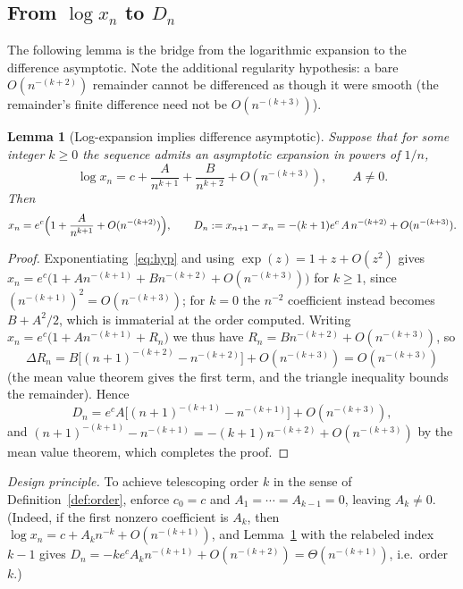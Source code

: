 \documentclass[11pt]{article}
\newtheorem{lemma}[theorem]{Lemma}
\theoremstyle{definition}
\begin{document}
\subsection{From $\log x_n$ to $D_n$}
The following lemma is the bridge from the logarithmic expansion to the
difference asymptotic. Note the additional regularity hypothesis: a bare
$O(n^{-(k+2)})$ remainder cannot be differenced as though it were smooth (the
remainder's finite difference need not be $O(n^{-(k+3)})$).

\begin{lemma}[Log-expansion implies difference asymptotic]\label{lem:logdiff}
Suppose that for some integer $k\ge0$ the sequence admits an asymptotic
expansion in powers of $1/n$,
\begin{equation}\label{eq:hyp}
  \log x_n = c + \frac{A}{n^{k+1}} + \frac{B}{n^{k+2}} + O(n^{-(k+3)}),
  \qquad A\neq0 .
\end{equation}
Then
\[
  x_n = e^{c}\Bigl(1 + \frac{A}{n^{k+1}} + O(n^{-(k+2)})\Bigr),
  \qquad
  D_n := x_{n+1}-x_n = -(k+1)e^{c}\,A\,n^{-(k+2)} + O(n^{-(k+3)}).
\]
\end{lemma}

\begin{proof}
Exponentiating~\eqref{eq:hyp} and using $\exp(z)=1+z+O(z^2)$ gives
$x_n = e^{c}\bigl(1 + A n^{-(k+1)} + B n^{-(k+2)} + O(n^{-(k+3)})\bigr)$ for
$k\ge1$, since $(n^{-(k+1)})^2 = O(n^{-(k+3)})$; for $k=0$ the $n^{-2}$
coefficient instead becomes $B+A^2/2$, which is immaterial at the order
computed. Writing $x_n = e^{c}\bigl(1 + A n^{-(k+1)} + R_n\bigr)$ we thus have
$R_n = B n^{-(k+2)} + O(n^{-(k+3)})$, so
\[
  \Delta R_n = B\bigl[(n+1)^{-(k+2)} - n^{-(k+2)}\bigr] + O(n^{-(k+3)})
            = O(n^{-(k+3)})
\]
(the mean value theorem gives the first term, and the triangle inequality
bounds the remainder). Hence
\[
  D_n = e^{c}A\bigl[(n+1)^{-(k+1)} - n^{-(k+1)}\bigr] + O(n^{-(k+3)}),
\]
and $(n+1)^{-(k+1)} - n^{-(k+1)} = -(k+1)n^{-(k+2)} + O(n^{-(k+3)})$ by the mean
value theorem, which completes the proof.
\end{proof}

\emph{Design principle.} To achieve telescoping order $k$ in the sense of
Definition~\ref{def:order}, enforce $c_0=c$ and $A_1=\cdots=A_{k-1}=0$, leaving
$A_k\neq0$. (Indeed, if the first nonzero coefficient is $A_k$, then
$\log x_n = c + A_k n^{-k} + O(n^{-(k+1)})$, and
Lemma~\ref{lem:logdiff} with the relabeled index $k-1$ gives
$D_n = -k e^{c}A_k n^{-(k+1)} + O(n^{-(k+2)}) = \Theta(n^{-(k+1)})$, i.e.\ order
$k$.)
\end{document}
